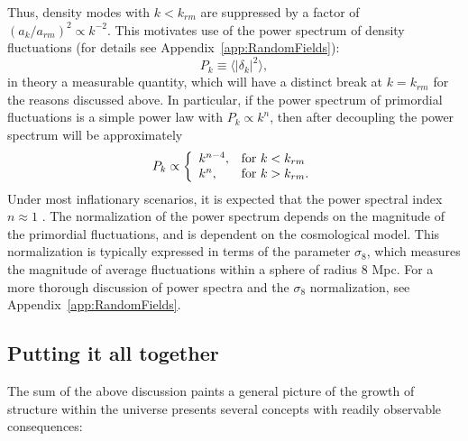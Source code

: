 Thus, density modes with $k < k_{rm}$ are suppressed by a factor of
$(a_k / a_{rm})^2 \propto k^{-2}$.  This motivates use of the power
spectrum of density fluctuations (for details see
Appendix~\ref{app:RandomFields}):
\begin{equation}
  \label{eq:power_spectrum}
  P_k \equiv \langle|\delta_k|^2\rangle,
\end{equation}
in theory a measurable quantity, which will have a distinct break at
$k = k_{rm}$ for the reasons discussed above.
In particular, if the power spectrum of primordial fluctuations
is a simple power law with $P_k \propto k^n$,
then after decoupling the power spectrum will be approximately
\begin{equation}
  P_k \propto \left\{
  \begin{array}{ll}
    k^{n-4}, & {\rm for\ } k < k_{rm} \\
    k^n, & {\rm for\ } k > k_{rm}.
  \end{array}
  \right.
\end{equation}
Under most inflationary scenarios, it is expected that the power spectral
index $n \approx 1$ \citep{peacock1999cosmological}.
The normalization of the power spectrum depends on the magnitude of the
primordial fluctuations, and is dependent on the cosmological model.
This normalization is typically expressed in terms of the parameter
$\sigma_8$, which measures the magnitude of average fluctuations within
a sphere of radius 8 Mpc.  For a more thorough discussion of power spectra
and the $\sigma_8$ normalization, see Appendix~\ref{app:RandomFields}.

\subsection{Putting it all together}
The sum of the above discussion paints a general picture of the growth of
structure within the universe presents several concepts with readily
observable consequences:

